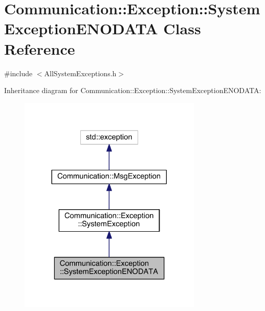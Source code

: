 \hypertarget{class_communication_1_1_exception_1_1_system_exception_e_n_o_d_a_t_a}{}\section{Communication\+:\+:Exception\+:\+:System\+Exception\+E\+N\+O\+D\+A\+T\+A Class Reference}
\label{class_communication_1_1_exception_1_1_system_exception_e_n_o_d_a_t_a}


{\ttfamily \#include $<$All\+System\+Exceptions.\+h$>$}



Inheritance diagram for Communication\+:\+:Exception\+:\+:System\+Exception\+E\+N\+O\+D\+A\+T\+A\+:\nopagebreak
\begin{figure}[H]
\begin{center}
\leavevmode
\includegraphics[width=248pt]{class_communication_1_1_exception_1_1_system_exception_e_n_o_d_a_t_a__inherit__graph}
\end{center}
\end{figure}


